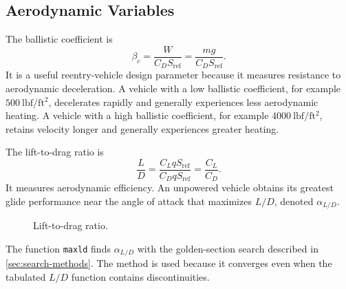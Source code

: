 \subsection{Aerodynamic Variables}\label{sec:aerodynamic-variables}

The ballistic coefficient is
\begin{equation}
  \beta_c
  =\frac{W}{C_DS_{\mathrm{ref}}}
  =\frac{mg}{C_DS_{\mathrm{ref}}}.
  \label{eq:ballistic-coefficient}
\end{equation}
It is a useful reentry-vehicle design parameter because it measures resistance to
aerodynamic deceleration. A vehicle with a low ballistic coefficient, for example
$500~\mathrm{lbf/ft^2}$, decelerates rapidly and generally experiences less
aerodynamic heating. A vehicle with a high ballistic coefficient, for example
$4000~\mathrm{lbf/ft^2}$, retains velocity longer and generally experiences greater
heating.

The lift-to-drag ratio is
\begin{equation}
  \frac{L}{D}
  =\frac{C_LqS_{\mathrm{ref}}}{C_DqS_{\mathrm{ref}}}
  =\frac{C_L}{C_D}.
  \label{eq:lift-to-drag-ratio}
\end{equation}
It measures aerodynamic efficiency. An unpowered vehicle obtains its greatest glide
performance near the angle of attack that maximizes $L/D$, denoted
$\alpha_{L/D}$.

\begin{figure}[htbp]
  \centering
  \resizebox{0.54\linewidth}{!}{}
  \caption{Lift-to-drag ratio.}
  \label{fig:lift-to-drag-ratio}
\end{figure}

The function \texttt{maxld} finds $\alpha_{L/D}$ with the golden-section search
described in \cref{sec:search-methods}. The method is used because it converges
even when the tabulated $L/D$ function contains discontinuities.
